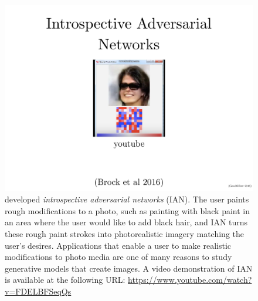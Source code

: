 \begin{figure}
  \centering
  \includegraphics[width=\textwidth]{ian}
  \caption{
    \citet{BrockLRW16a} developed {\em introspective adversarial networks} (IAN).
    The user paints rough modifications to a photo, such as painting
    with black paint in an area where the user would like to add black
    hair, and IAN turns these rough paint strokes into photorealistic
    imagery matching the user's desires.
    Applications that enable a user to make realistic modifications to
    photo media are one of many reasons to study generative models
    that create images.
    A video demonstration of IAN is available at the following URL:
    \url{https://www.youtube.com/watch?v=FDELBFSeqQs}
  }
  \label{fig:ian}
\end{figure}

